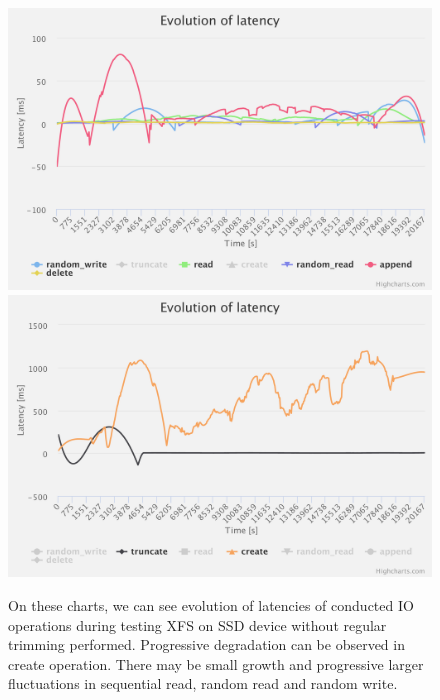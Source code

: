 \documentclass[
  color, %
  table, %
  lof,   %
  lot,   %
]{fithesis3}
\begin{document}
\begin{figure}[!htb]
    \centering
   \begin{minipage}{\textwidth}
        \centering
        \includegraphics[width=\textwidth]{../charts/SSD_xfs_notrim/1}
        \includegraphics[width=\textwidth]{../charts/SSD_xfs_notrim/2}
                \caption[Evolution of latencies of XFS during testing on SSD without regular trimming]{On these charts, we can see evolution of latencies of conducted IO operations during testing XFS on SSD device without regular trimming performed. Progressive degradation can be observed in create operation. There may be small growth and progressive larger fluctuations in sequential read, random read and random write.}
\label{fig:lats_xfs_ssd_notrim}
    \end{minipage}
\end{figure}

\clearpage
\end{document}
